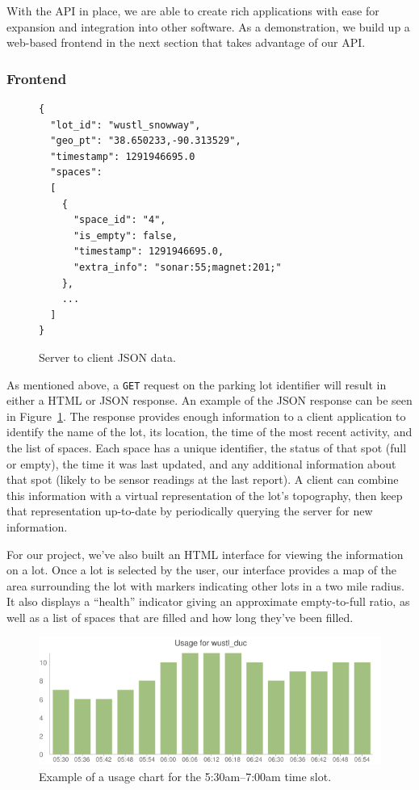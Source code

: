 \documentclass{acm_proc}
\begin{document}
With the API in place, we are able to create rich applications with ease
for expansion and integration into other software.
As a demonstration, we build up a web-based frontend in the next section
that takes advantage of our API.

\subsubsection{Frontend}

\begin{figure}
    \begin{verbatim}
{
  "lot_id": "wustl_snowway",
  "geo_pt": "38.650233,-90.313529",
  "timestamp": 1291946695.0
  "spaces":
  [
    {
      "space_id": "4",
      "is_empty": false,
      "timestamp": 1291946695.0,
      "extra_info": "sonar:55;magnet:201;"
    },
    ...
  ]
}
\end{verbatim}
	\caption{Server to client JSON data.}
	\label{fig:serverclientjson}
\end{figure}

As mentioned above, a \texttt{GET} request on the parking lot identifier
will result in either a HTML or JSON response.
An example of the JSON response can be seen in
Figure~\ref{fig:serverclientjson}.
The response provides enough information to a client application to
identify the name of the lot, its location, the time of the most recent
activity, and the list of spaces.
Each space has a unique identifier, the status of that spot (full or
empty), the time it was last updated, and any additional information about
that spot (likely to be sensor readings at the last report).
A client can combine this information with a virtual representation of the
lot's topography, then keep that representation up-to-date by periodically
querying the server for new information.

For our project, we've also built an HTML interface for viewing the
information on a lot.
Once a lot is selected by the user, our interface provides a map of the
area surrounding the lot with markers indicating other lots in a two mile
radius.
It also displays a ``health'' indicator giving an approximate empty-to-full
ratio, as well as a list of spaces that are filled and how long they've
been filled.

\begin{figure}
    \begin{center}
		\includegraphics[width=\columnwidth]{figures/fullness-chart}
	\end{center}
	\caption{Example of a usage chart for the 5:30am--7:00am time slot.}
	\label{fig:fullness-chart}
\end{figure}
\end{document}
